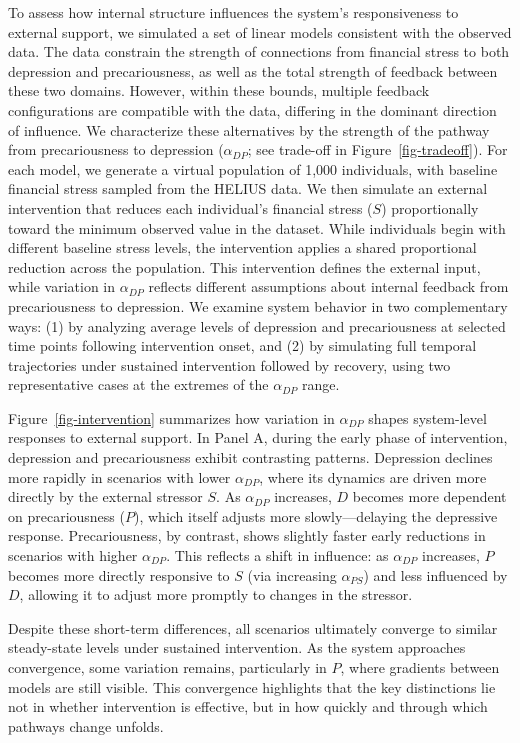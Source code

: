 \documentclass[
]{article}
\begin{document}
To assess how internal structure influences the system's responsiveness
to external support, we simulated a set of linear models consistent with
the observed data. The data constrain the strength of connections from
financial stress to both depression and precariousness, as well as the
total strength of feedback between these two domains. However, within
these bounds, multiple feedback configurations are compatible with the
data, differing in the dominant direction of influence. We characterize
these alternatives by the strength of the pathway from precariousness to
depression (\(\alpha_{DP}\); see trade-off in
Figure~\ref{fig-tradeoff}). For each model, we generate a virtual
population of 1,000 individuals, with baseline financial stress sampled
from the HELIUS data. We then simulate an external intervention that
reduces each individual's financial stress (\(S\)) proportionally toward
the minimum observed value in the dataset. While individuals begin with
different baseline stress levels, the intervention applies a shared
proportional reduction across the population. This intervention defines
the external input, while variation in \(\alpha_{DP}\) reflects
different assumptions about internal feedback from precariousness to
depression. We examine system behavior in two complementary ways: (1) by
analyzing average levels of depression and precariousness at selected
time points following intervention onset, and (2) by simulating full
temporal trajectories under sustained intervention followed by recovery,
using two representative cases at the extremes of the \(\alpha_{DP}\)
range.

Figure~\ref{fig-intervention} summarizes how variation in
\(\alpha_{DP}\) shapes system-level responses to external support. In
Panel A, during the early phase of intervention, depression and
precariousness exhibit contrasting patterns. Depression declines more
rapidly in scenarios with lower \(\alpha_{DP}\), where its dynamics are
driven more directly by the external stressor \(S\). As \(\alpha_{DP}\)
increases, \(D\) becomes more dependent on precariousness (\(P\)), which
itself adjusts more slowly---delaying the depressive response.
Precariousness, by contrast, shows slightly faster early reductions in
scenarios with higher \(\alpha_{DP}\). This reflects a shift in
influence: as \(\alpha_{DP}\) increases, \(P\) becomes more directly
responsive to \(S\) (via increasing \(\alpha_{PS}\)) and less influenced
by \(D\), allowing it to adjust more promptly to changes in the
stressor.

Despite these short-term differences, all scenarios ultimately converge
to similar steady-state levels under sustained intervention. As the
system approaches convergence, some variation remains, particularly in
\(P\), where gradients between models are still visible. This
convergence highlights that the key distinctions lie not in whether
intervention is effective, but in how quickly and through which pathways
change unfolds.
\end{document}
